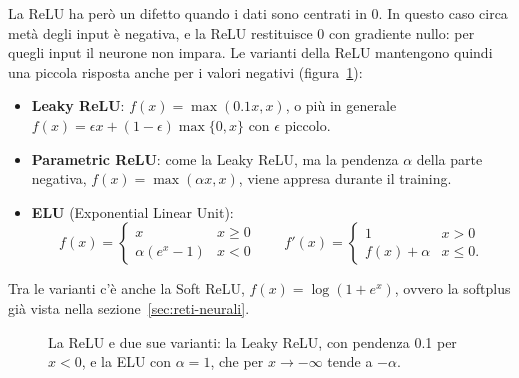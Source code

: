 La ReLU ha però un difetto quando i dati sono centrati in 0. In questo caso circa metà degli input è negativa, e la ReLU restituisce 0 con gradiente nullo: per quegli input il neurone non impara. Le varianti della ReLU mantengono quindi una piccola risposta anche per i valori negativi (figura~\ref{fig:relu-varianti}):
\begin{itemize}
    \item \textbf{Leaky ReLU}: $f(x) = \max(0.1x, x)$, o più in generale $f(x) = \epsilon x + (1 - \epsilon)\max\{0, x\}$ con $\epsilon$ piccolo.
    \item \textbf{Parametric ReLU}: come la Leaky ReLU, ma la pendenza $\alpha$ della parte negativa, $f(x) = \max(\alpha x, x)$, viene appresa durante il training.
    \item \textbf{ELU} (Exponential Linear Unit):
    \[
    f(x) = \begin{cases} x & x \ge 0 \\ \alpha(e^x - 1) & x < 0 \end{cases}
    \qquad
    f'(x) = \begin{cases} 1 & x > 0 \\ f(x) + \alpha & x \le 0. \end{cases}
    \]
\end{itemize}
Tra le varianti c'è anche la Soft ReLU, $f(x) = \log(1 + e^x)$, ovvero la softplus già vista nella sezione~\ref{sec:reti-neurali}.

\begin{figure}[htbp]
\centering
{}
\caption{La ReLU e due sue varianti: la Leaky ReLU, con pendenza 0.1 per $x < 0$, e la ELU con $\alpha = 1$, che per $x \to -\infty$ tende a $-\alpha$.}
\label{fig:relu-varianti}
\end{figure}

